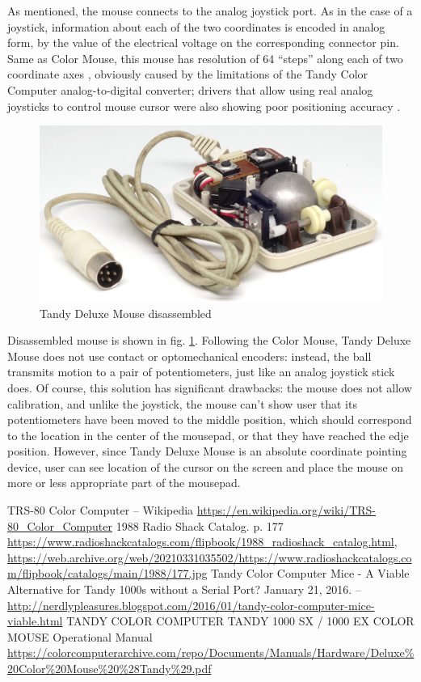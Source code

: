 \documentclass[11pt, a4paper]{article}
\begin{document}
As mentioned, the mouse connects to the analog joystick port. As in the case of a joystick, information about each of the two coordinates is encoded in analog form, by the value of the electrical voltage on the corresponding connector pin. Same as Color Mouse, this mouse has resolution of 64 ``steps'' along each of two coordinate axes \cite{manual}, obviously caused by the limitations of the Tandy Color Computer analog-to-digital converter; drivers that allow using real analog joysticks to control mouse cursor were also showing poor positioning accuracy \cite{hierophant}.

\begin{figure}[h]
    \centering
    \includegraphics[scale=0.8]{1988_tandy_trs80_deluxe_mouse/inside_30.jpg}
    \caption{Tandy Deluxe Mouse disassembled}
    \label{fig:TandyDeluxeMouseInside}
\end{figure}

Disassembled mouse is shown in fig. \ref{fig:TandyDeluxeMouseInside}. Following the Color Mouse, Tandy Deluxe Mouse does not use contact or optomechanical encoders: instead, the ball transmits motion to a pair of potentiometers, just like an analog joystick stick does. Of course, this solution has significant drawbacks: the mouse does not allow calibration, and unlike the joystick, the mouse can't show user that its potentiometers have been moved to the middle position, which should correspond to the location in the center of the mousepad, or that they have reached the edje position. However, since Tandy Deluxe Mouse is an absolute coordinate pointing device, user can see location of the cursor on the screen and place the mouse on more or less appropriate part of the mousepad.

\begin{thebibliography}{9}
 TRS-80 Color Computer -- Wikipedia \url{https://en.wikipedia.org/wiki/TRS-80_Color_Computer}
 1988 Radio Shack Catalog. p. 177 \url{https://www.radioshackcatalogs.com/flipbook/1988_radioshack_catalog.html}, \url{https://web.archive.org/web/20210331035502/https://www.radioshackcatalogs.com/flipbook/catalogs/main/1988/177.jpg}
 Tandy Color Computer Mice - A Viable Alternative for Tandy 1000s without a Serial Port? January 21, 2016. -- \url{http://nerdlypleasures.blogspot.com/2016/01/tandy-color-computer-mice-viable.html}
 TANDY  COLOR COMPUTER TANDY 1000 SX / 1000 EX COLOR MOUSE Operational Manual \url{https://colorcomputerarchive.com/repo/Documents/Manuals/Hardware/Deluxe%20Color%20Mouse%20%28Tandy%29.pdf}
\end{thebibliography}
\end{document}
